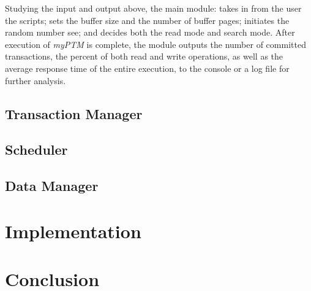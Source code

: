 \documentclass[12pt]{article}
\begin{document}
Studying the input and output above, the main module: takes in from the user the scripts; sets the buffer size and the number of buffer pages; initiates the random number see; and decides both the read mode and search mode. After execution of \textit{myPTM} is complete, the module outputs the number of committed transactions, the percent of both read and write operations, as well as the average response time of the entire execution, to the console or a log file for further analysis.

\subsection{ Transaction Manager }

\subsection{Scheduler}

\subsection{Data Manager}

\section{Implementation}

\section{Conclusion}
\end{document}
